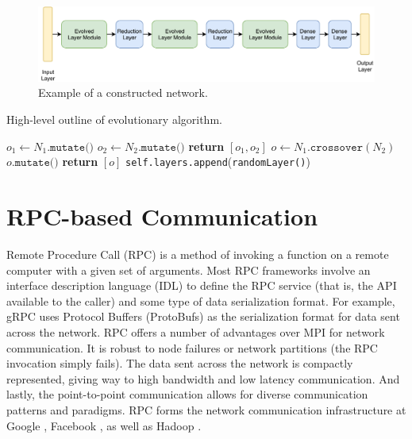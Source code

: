 \documentclass[conference]{IEEEtran}
\begin{document}
\begin{figure}
  \centering
  \includegraphics[width=.85\textwidth]{img/sample_arch}
  \caption{Example of a constructed network.}
  \label{fig:sample-arch}
\end{figure}


\begin{algorithm}
  \caption{High-level outline of evolutionary algorithm.}\label{alg:evo-simple}
  \begin{algorithmic}[1]
    \State $o_1\gets N_1.\texttt{mutate()}$
    \State $o_2 \gets N_2.\texttt{mutate()}$
    \State \textbf{return } $[o_1, o_2]$
    \EndIf
    \State $o \gets N_1.\texttt{crossover}(N_2)$
    \State $o.\texttt{mutate()}$
    \State \textbf{return } $[o]$
  \EndProcedure
  \State \texttt{self.layers.append}(\texttt{randomLayer()})
  \EndProcedure
  \end{algorithmic}
\end{algorithm}

\section{RPC-based Communication}
Remote Procedure Call (RPC) is a method of invoking a function on a remote
computer with a given set of arguments. Most RPC frameworks involve an interface
description language (IDL)
to define the RPC service (that is, the API available to the caller) and some
type of data serialization format. For example, gRPC uses Protocol Buffers (ProtoBufs)
\cite{Varda2008} as the serialization format for data sent across the network.
RPC offers a number of advantages over MPI for network communication. It is robust to
node failures or network partitions (the RPC invocation simply fails). The data
sent across the network is compactly represented, giving way to high bandwidth
and low latency communication. And lastly, the point-to-point communication allows for
diverse communication patterns and paradigms. RPC forms the network communication
infrastructure at Google \cite{van2017production}, Facebook \cite{Slee2007},
as well as Hadoop
\cite{Shvachko:2010:HDF:1913798.1914427, Lu:2013:HDH:2570457.2571128}.
\end{document}
